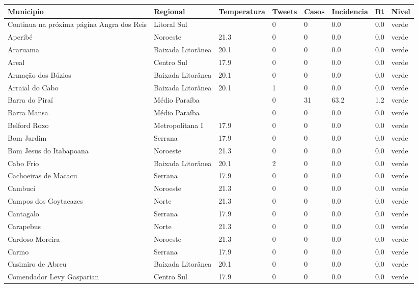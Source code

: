 \begin{longtable}{l|lllllll}
  \hline
Municipio & Regional & Temperatura & Tweets & Casos & Incidencia & Rt & Nivel \\ 
  \hline
\endhead
\hline
{\footnotesize Continua na próxima página}
\endfoot
\endlastfoot
Angra dos Reis & Litoral Sul &  & 0 & 0 & 0.0 & 0.0 & verde \\ 
  Aperibé & Noroeste & 21.3 & 0 & 0 & 0.0 & 0.0 & verde \\ 
  Araruama & Baixada Litorânea & 20.1 & 0 & 0 & 0.0 & 0.0 & verde \\ 
  Areal & Centro Sul & 17.9 & 0 & 0 & 0.0 & 0.0 & verde \\ 
  Armação dos Búzios & Baixada Litorânea & 20.1 & 0 & 0 & 0.0 & 0.0 & verde \\ 
  Arraial do Cabo & Baixada Litorânea & 20.1 & 1 & 0 & 0.0 & 0.0 & verde \\ 
  Barra do Piraí & Médio Paraíba &  & 0 & 31 & 63.2 & 1.2 & verde \\ 
  Barra Mansa & Médio Paraíba &  & 0 & 0 & 0.0 & 0.0 & verde \\ 
  Belford Roxo & Metropolitana I & 17.9 & 0 & 0 & 0.0 & 0.0 & verde \\ 
  Bom Jardim & Serrana & 17.9 & 0 & 0 & 0.0 & 0.0 & verde \\ 
  Bom Jesus do Itabapoana & Noroeste & 21.3 & 0 & 0 & 0.0 & 0.0 & verde \\ 
  Cabo Frio & Baixada Litorânea & 20.1 & 2 & 0 & 0.0 & 0.0 & verde \\ 
  Cachoeiras de Macacu & Serrana & 17.9 & 0 & 0 & 0.0 & 0.0 & verde \\ 
  Cambuci & Noroeste & 21.3 & 0 & 0 & 0.0 & 0.0 & verde \\ 
  Campos dos Goytacazes & Norte & 21.3 & 0 & 0 & 0.0 & 0.0 & verde \\ 
  Cantagalo & Serrana & 17.9 & 0 & 0 & 0.0 & 0.0 & verde \\ 
  Carapebus & Norte & 21.3 & 0 & 0 & 0.0 & 0.0 & verde \\ 
  Cardoso Moreira & Noroeste & 21.3 & 0 & 0 & 0.0 & 0.0 & verde \\ 
  Carmo & Serrana & 17.9 & 0 & 0 & 0.0 & 0.0 & verde \\ 
  Casimiro de Abreu & Baixada Litorânea & 20.1 & 0 & 0 & 0.0 & 0.0 & verde \\ 
  Comendador Levy Gasparian & Centro Sul & 17.9 & 0 & 0 & 0.0 & 0.0 & verde \\ 

\end{longtable}
